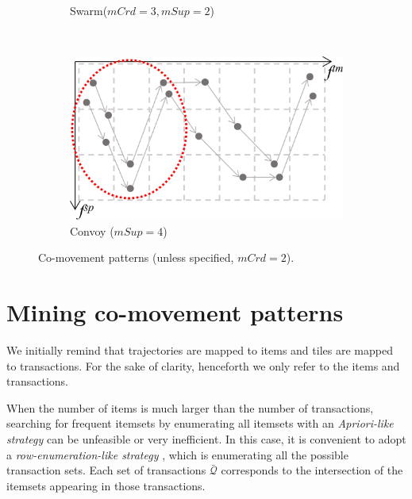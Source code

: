 \documentclass[preprint,12pt,authoryear]{elsarticle} %
\begin{document}
\begin{figure}[t]
\begin{subfigure}[t]{.53\columnwidth}
        \caption{Swarm($mCrd=3,mSup=2$)}
        \label{fig:swarm}
    \end{subfigure}~
    \begin{subfigure}[t]{.5\columnwidth}
        \centering
        \includegraphics[scale=.18]{flock.pdf}
        \caption{Convoy ($mSup=4$)}
        \label{fig:flock}
    \end{subfigure}
    \caption{Co-movement patterns (unless specified, $mCrd=2$).}
    \label{fig:allpatterns}
\end{figure}


\section{Mining co-movement patterns}\label{sec:mining}
We initially remind that trajectories are mapped to items and tiles are mapped to transactions.
For the sake of clarity, henceforth we only refer to the items and transactions.

When the number of items is much larger than the number of transactions, searching for frequent itemsets by enumerating all itemsets with an \textit{Apriori-like strategy} \citep{DBLP:conf/vldb/AgrawalS94} can be unfeasible or very inefficient.
In this case, it is convenient to adopt a \textit{row-enumeration-like strategy} \citep{DBLP:conf/kdd/PanCTYZ03}, which is enumerating all the possible transaction sets.
Each set of transactions $\bar{\mathcal{Q}}$ corresponds to the intersection of the itemsets appearing in those transactions.
\end{document}
